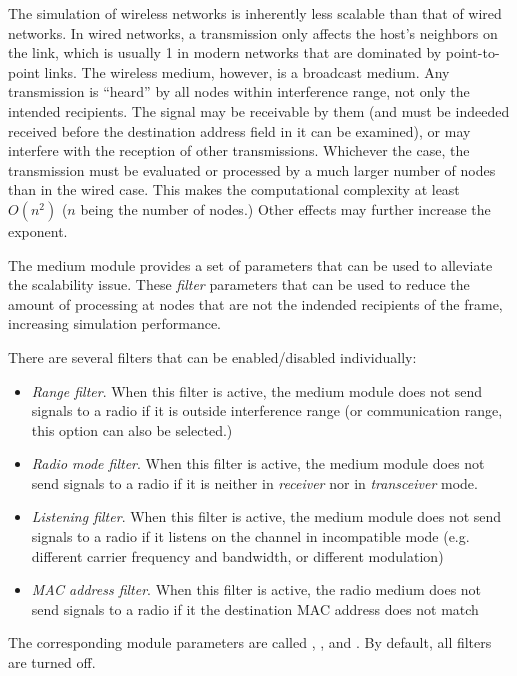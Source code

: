 The simulation of wireless networks is inherently less scalable than
that of wired networks. In wired networks, a transmission only affects
the host's neighbors on the link, which is usually 1 in modern networks
that are dominated by point-to-point links. The wireless medium, however,
is a broadcast medium. Any transmission is ``heard'' by all nodes
within interference range, not only the intended recipients.
The signal may be receivable by them (and must be indeeded received
before the destination address field in it can be examined),
or may interfere with the reception of other transmissions.
Whichever the case, the transmission must be evaluated or processed
by a much larger number of nodes than in the wired case.
This makes the computational complexity at least $O(n^2)$ ($n$ being
the number of nodes.) Other effects may further increase the exponent.

The medium module provides a set of parameters that can be used
to alleviate the scalability issue. These \textit{filter} parameters
that can be used to reduce the amount of processing at nodes that are
not the indended recipients of the frame, increasing simulation performance.

There are several filters that can be enabled/disabled individually:

\begin{itemize}
  \item \textit{Range filter}. When this filter is active, the medium module
    does not send signals to a radio if it is outside interference range
    (or communication range, this option can also be selected.)
  \item \textit{Radio mode filter}. When this filter is active,
    the medium module does not send signals to a radio if it is neither
    in \textit{receiver} nor in \textit{transceiver} mode.
  \item \textit{Listening filter}. When this filter is active, the medium module
    does not send signals to a radio if it listens on the channel in
    incompatible mode (e.g. different carrier frequency and bandwidth,
    or different modulation)
  \item \textit{MAC address filter}. When this filter is active, the radio medium
    does not send signals to a radio if it the destination MAC address
    does not match
\end{itemize}

The corresponding module parameters are called ,
,  and .
By default, all filters are turned off.

